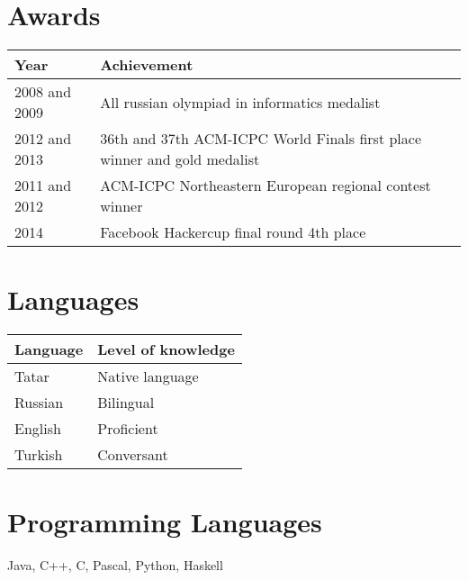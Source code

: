 \documentclass[11pt,a4paper,oneside]{article}
\begin{document}
\section{Awards}
\begin{center}
    \begin{tabular}{l|l}
        Year&Achievement \\
        \hline
        2008 and 2009& All russian olympiad in informatics medalist \\
        2012 and 2013 &36th and 37th ACM-ICPC World Finals first place winner and gold medalist \\
        2011 and 2012&ACM-ICPC Northeastern European regional contest winner \\
        2014 & Facebook Hackercup final round 4th place
    \end{tabular}
\end{center}

\section{Languages}
\begin{center}  
    \begin{tabular}{l|l}
        Language&Level of knowledge \\
        \hline
        Tatar&Native language \\
        Russian&Bilingual \\ 
        English&Proficient \\
        Turkish&Conversant \\
    \end{tabular}
\end{center}
\section{Programming Languages}
    Java, C++, C, Pascal, Python, Haskell
\end{document}

